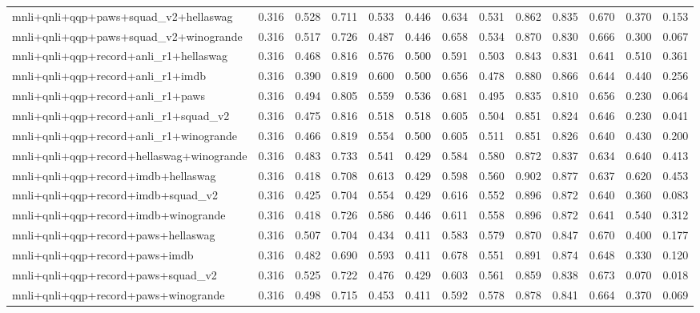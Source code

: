 \begin{table}[t]
\begin{tabular}{lrrrrrrrrrrrr}
    mnli+qnli+qqp+paws+squad\_v2+hellaswag & 0.316 & 0.528 & 0.711 & 0.533 & 0.446 & 0.634 & 0.531 & 0.862 & 0.835 & 0.670 & 0.370 & 0.153 \\
    mnli+qnli+qqp+paws+squad\_v2+winogrande & 0.316 & 0.517 & 0.726 & 0.487 & 0.446 & 0.658 & 0.534 & 0.870 & 0.830 & 0.666 & 0.300 & 0.067 \\
    mnli+qnli+qqp+record+anli\_r1+hellaswag & 0.316 & 0.468 & 0.816 & 0.576 & 0.500 & 0.591 & 0.503 & 0.843 & 0.831 & 0.641 & 0.510 & 0.361 \\
    mnli+qnli+qqp+record+anli\_r1+imdb & 0.316 & 0.390 & 0.819 & 0.600 & 0.500 & 0.656 & 0.478 & 0.880 & 0.866 & 0.644 & 0.440 & 0.256 \\
    mnli+qnli+qqp+record+anli\_r1+paws & 0.316 & 0.494 & 0.805 & 0.559 & 0.536 & 0.681 & 0.495 & 0.835 & 0.810 & 0.656 & 0.230 & 0.064 \\
    mnli+qnli+qqp+record+anli\_r1+squad\_v2 & 0.316 & 0.475 & 0.816 & 0.518 & 0.518 & 0.605 & 0.504 & 0.851 & 0.824 & 0.646 & 0.230 & 0.041 \\
    mnli+qnli+qqp+record+anli\_r1+winogrande & 0.316 & 0.466 & 0.819 & 0.554 & 0.500 & 0.605 & 0.511 & 0.851 & 0.826 & 0.640 & 0.430 & 0.200 \\
    mnli+qnli+qqp+record+hellaswag+winogrande & 0.316 & 0.483 & 0.733 & 0.541 & 0.429 & 0.584 & 0.580 & 0.872 & 0.837 & 0.634 & 0.640 & 0.413 \\
    mnli+qnli+qqp+record+imdb+hellaswag & 0.316 & 0.418 & 0.708 & 0.613 & 0.429 & 0.598 & 0.560 & 0.902 & 0.877 & 0.637 & 0.620 & 0.453 \\
    mnli+qnli+qqp+record+imdb+squad\_v2 & 0.316 & 0.425 & 0.704 & 0.554 & 0.429 & 0.616 & 0.552 & 0.896 & 0.872 & 0.640 & 0.360 & 0.083 \\
    mnli+qnli+qqp+record+imdb+winogrande & 0.316 & 0.418 & 0.726 & 0.586 & 0.446 & 0.611 & 0.558 & 0.896 & 0.872 & 0.641 & 0.540 & 0.312 \\
    mnli+qnli+qqp+record+paws+hellaswag & 0.316 & 0.507 & 0.704 & 0.434 & 0.411 & 0.583 & 0.579 & 0.870 & 0.847 & 0.670 & 0.400 & 0.177 \\
    mnli+qnli+qqp+record+paws+imdb & 0.316 & 0.482 & 0.690 & 0.593 & 0.411 & 0.678 & 0.551 & 0.891 & 0.874 & 0.648 & 0.330 & 0.120 \\
    mnli+qnli+qqp+record+paws+squad\_v2 & 0.316 & 0.525 & 0.722 & 0.476 & 0.429 & 0.603 & 0.561 & 0.859 & 0.838 & 0.673 & 0.070 & 0.018 \\
    mnli+qnli+qqp+record+paws+winogrande & 0.316 & 0.498 & 0.715 & 0.453 & 0.411 & 0.592 & 0.578 & 0.878 & 0.841 & 0.664 & 0.370 & 0.069 \\

\end{tabular}
\end{table}
